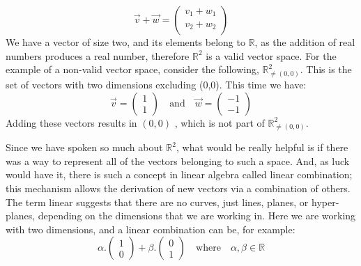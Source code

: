 \documentclass[600paper, 11pt,twoside,openany]{kdp}
\begin{document}
\[
\overrightarrow{v} + \overrightarrow{w} = \begin{pmatrix}
 v_1 + w_1\\
 v_2 + w_2\\
\end{pmatrix}
\]
\indent 
We have a vector of size two, and its elements belong to $\mathbb{R}$, as the addition of real numbers produces a real number, therefore $\mathbb{R}^2$ is a valid vector space. For the example of a non-valid vector space, consider the following, $\mathbb R^2_{\ne (0,0)}$. This is the set of vectors with two dimensions excluding (0,0). This time we have:
 \[\overrightarrow{v}  = \begin{pmatrix}
 1\\
 1
\end{pmatrix}  \quad \textrm{and} \quad \overrightarrow{w} = \begin{pmatrix}
 -1\\
 -1
\end{pmatrix}  \]
\indent Adding these vectors results in $(0,0)$ , which is not part of  $\mathbb R^2_{\ne (0,0)}$. 
\par 
\vspace{-3pt}
\indent Since we have spoken so much about $\mathbb{R}^2$, what would be really helpful is if there was a way to represent all of the vectors belonging to such a space. And, as luck would have it, there is such a concept in linear algebra called linear combination; this mechanism allows the derivation of new vectors via a combination of others. The term linear suggests that there are no curves, just lines, planes, or hyper-planes, depending on the dimensions that we are working in. Here we are working with two dimensions, and a linear combination can be, for example:
\[ \alpha.\begin{pmatrix}
 1 \\
 0
 \end{pmatrix} + \beta.\begin{pmatrix}
 0 \\
 1
 \end{pmatrix} \quad \textrm{where} \quad  \alpha, \beta \in \mathbb{R} \]
\end{document}
